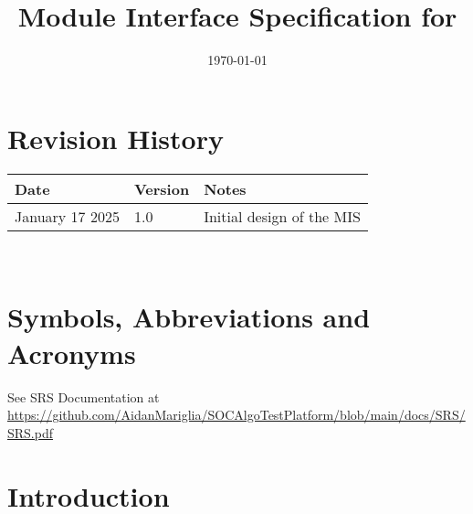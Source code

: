 \documentclass[12pt, titlepage]{article}
\begin{document}
\title{Module Interface Specification for \progname{}}

\author{\authname}

\date{\today}

\maketitle


\section{Revision History}

\begin{tabularx}{\textwidth}{p{3cm}p{2cm}X}
\toprule {\bf Date} & {\bf Version} & {\bf Notes}\\
\midrule
January 17 2025 & 1.0 & Initial design of the MIS\\
\bottomrule
\end{tabularx}

~\newpage

\section{Symbols, Abbreviations and Acronyms}

See SRS Documentation at \url{https://github.com/AidanMariglia/SOCAlgoTestPlatform/blob/main/docs/SRS/SRS.pdf}

\newpage

\tableofcontents

\newpage


\section{Introduction}
\end{document}
